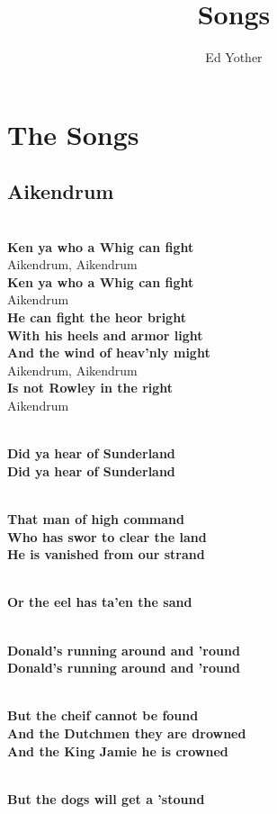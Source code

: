 \documentclass[letterpaper,12pt]{article}
\title{Songs}
\author{Ed Yother}
\begin{document}
\maketitle

\section{The Songs}
\subsection{Aikendrum}
\begin{multicols}{2}
\noindent
\\\textbf{Ken ya who a Whig can fight}
\\Aikendrum, Aikendrum
\\\textbf{Ken ya who a Whig can fight}
\\Aikendrum
\\\textbf{He can fight the heor bright
\\With his heels and armor light
\\And the wind of heav'nly might}
\\Aikendrum, Aikendrum
\\\textbf{Is not Rowley in the right}
\\Aikendrum

\noindent
\\\textbf{Did ya hear of Sunderland}
\\\textbf{Did ya hear of Sunderland}

\noindent
\\\textbf{That man of high command
\\Who has swor to clear the land
\\He is vanished from our strand}

\noindent
\\\textbf{Or the eel has ta'en the sand}

\columnbreak
\noindent
\\\textbf{Donald's running around and 'round}
\\\textbf{Donald's running around and 'round}

\noindent
\\\textbf{But the cheif cannot be found
\\And the Dutchmen they are drowned
\\And the King Jamie he is crowned}

\noindent
\\\textbf{But the dogs will get a 'stound}


\end{multicols}
\end{document}
